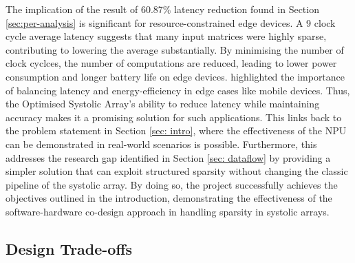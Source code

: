 \documentclass[12pt, a4paper, ukenglish]{article}
\begin{document}
    The implication of the result of 60.87\% latency reduction found in Section \ref{sec:per-analysis} is significant for resource-constrained edge devices. A 9 clock cycle average latency suggests that many input matrices were highly sparse, contributing to lowering the average substantially. By minimising the number of clock cyclces, the number of computations are reduced, leading to lower power consumption and longer battery life on edge devices. \textcite{wang_rethinking_2017} highlighted the importance of balancing latency and energy-efficiency in edge cases like mobile devices. Thus, the Optimised Systolic Array's ability to reduce latency while maintaining accuracy makes it a promising solution for such applications. This links back to the problem statement in Section \ref{sec: intro}, where the effectiveness of the NPU can be demonstrated in real-world scenarios is possible. Furthermore, this addresses the research gap identified in Section \ref{sec: dataflow} by providing a simpler solution that can exploit structured sparsity without changing the classic pipeline of the systolic array. By doing so, the project successfully achieves the objectives outlined in the introduction, demonstrating the effectiveness of the software-hardware co-design approach in handling sparsity in systolic arrays.
    
    



    \subsection{Design Trade-offs} \label{sec: trade-offs}

\end{document}
